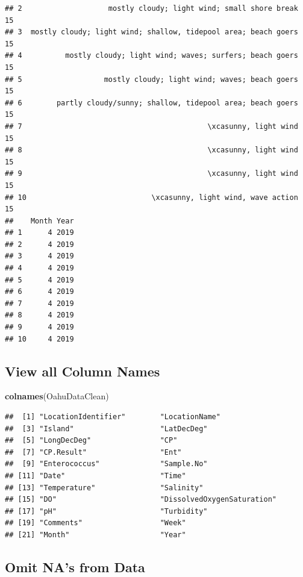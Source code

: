 \documentclass[12pt,]{article}
\newenvironment{Shaded}{\begin{snugshade}}{\end{snugshade}}
\newcommand{\KeywordTok}[1]{\textcolor[rgb]{0.13,0.29,0.53}{\textbf{#1}}}
\newcommand{\NormalTok}[1]{#1}
\begin{document}
\begin{verbatim}
## 2                    mostly cloudy; light wind; small shore break   15
## 3  mostly cloudy; light wind; shallow, tidepool area; beach goers   15
## 4          mostly cloudy; light wind; waves; surfers; beach goers   15
## 5                   mostly cloudy; light wind; waves; beach goers   15
## 6        partly cloudy/sunny; shallow, tidepool area; beach goers   15
## 7                                           \xcasunny, light wind   15
## 8                                           \xcasunny, light wind   15
## 9                                           \xcasunny, light wind   15
## 10                             \xcasunny, light wind, wave action   15
##    Month Year
## 1      4 2019
## 2      4 2019
## 3      4 2019
## 4      4 2019
## 5      4 2019
## 6      4 2019
## 7      4 2019
## 8      4 2019
## 9      4 2019
## 10     4 2019
\end{verbatim}

\subsection{View all Column Names}\label{view-all-column-names}

\begin{Shaded}
\begin{Highlighting}[]
\KeywordTok{colnames}\NormalTok{(OahuDataClean)}
\end{Highlighting}
\end{Shaded}

\begin{verbatim}
##  [1] "LocationIdentifier"        "LocationName"             
##  [3] "Island"                    "LatDecDeg"                
##  [5] "LongDecDeg"                "CP"                       
##  [7] "CP.Result"                 "Ent"                      
##  [9] "Enterococcus"              "Sample.No"                
## [11] "Date"                      "Time"                     
## [13] "Temperature"               "Salinity"                 
## [15] "DO"                        "DissolvedOxygenSaturation"
## [17] "pH"                        "Turbidity"                
## [19] "Comments"                  "Week"                     
## [21] "Month"                     "Year"
\end{verbatim}

\subsection{Omit NA's from Data}\label{omit-nas-from-data}
\end{document}
